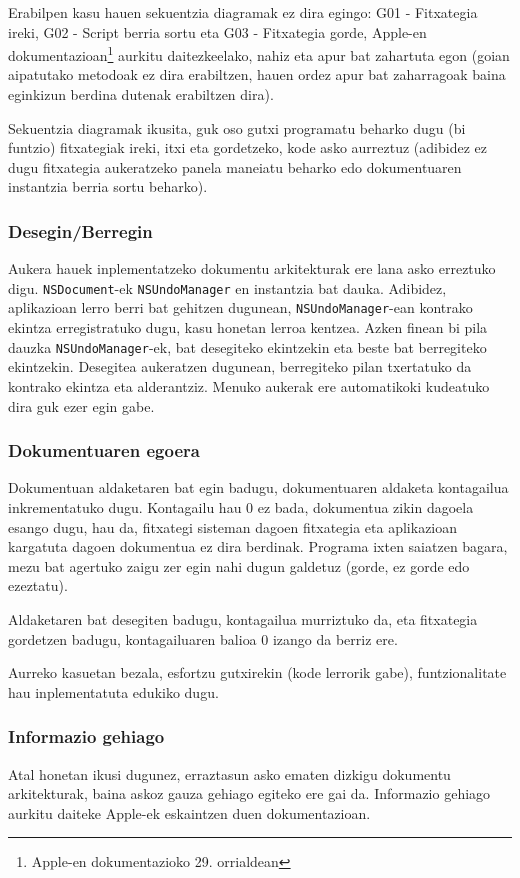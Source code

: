 Erabilpen kasu hauen sekuentzia diagramak ez dira egingo: G01 - Fitxategia ireki, G02 - Script berria sortu eta G03 - Fitxategia gorde, Apple-en dokumentazioan\footnote{Apple-en dokumentazioko\cite{ap:dba} 29. orrialdean} aurkitu daitezkeelako, nahiz eta apur bat zahartuta egon (goian aipatutako metodoak ez dira erabiltzen, hauen ordez apur bat zaharragoak baina eginkizun berdina dutenak erabiltzen dira).

Sekuentzia diagramak ikusita, guk oso gutxi programatu beharko dugu (bi funtzio) fitxategiak ireki, itxi eta gordetzeko, kode asko aurreztuz (adibidez ez dugu fitxategia aukeratzeko panela maneiatu beharko edo dokumentuaren instantzia berria sortu beharko).

\subsubsection{Desegin/Berregin}
Aukera hauek inplementatzeko dokumentu arkitekturak ere lana asko erreztuko digu. \texttt{NSDocument}-ek \texttt{NSUndoManager} en instantzia bat dauka. Adibidez, aplikazioan lerro berri bat gehitzen dugunean, \texttt{NSUndoManager}-ean kontrako ekintza erregistratuko dugu, kasu honetan lerroa kentzea. Azken finean bi pila dauzka \texttt{NSUndoManager}-ek, bat desegiteko ekintzekin eta beste bat berregiteko ekintzekin. Desegitea aukeratzen dugunean, berregiteko pilan txertatuko da kontrako ekintza eta alderantziz. Menuko aukerak ere automatikoki kudeatuko dira guk ezer egin gabe.

\subsubsection{Dokumentuaren egoera}
Dokumentuan aldaketaren bat egin badugu, dokumentuaren aldaketa kontagailua inkrementatuko dugu. Kontagailu hau 0 ez bada, dokumentua zikin dagoela esango dugu, hau da, fitxategi sisteman dagoen fitxategia eta aplikazioan kargatuta dagoen dokumentua ez dira berdinak. Programa ixten saiatzen bagara, mezu bat agertuko zaigu zer egin nahi dugun galdetuz (gorde, ez gorde edo ezeztatu).

Aldaketaren bat desegiten badugu, kontagailua murriztuko da, eta fitxategia gordetzen badugu, kontagailuaren balioa 0 izango da berriz ere.

Aurreko kasuetan bezala, esfortzu gutxirekin (kode lerrorik gabe), funtzionalitate hau inplementatuta edukiko dugu.

\subsubsection{Informazio gehiago}
Atal honetan ikusi dugunez, erraztasun asko ematen dizkigu dokumentu arkitekturak, baina askoz gauza gehiago egiteko ere gai da. Informazio gehiago aurkitu daiteke Apple-ek eskaintzen duen dokumentazioan\cite{ap:dba}.

